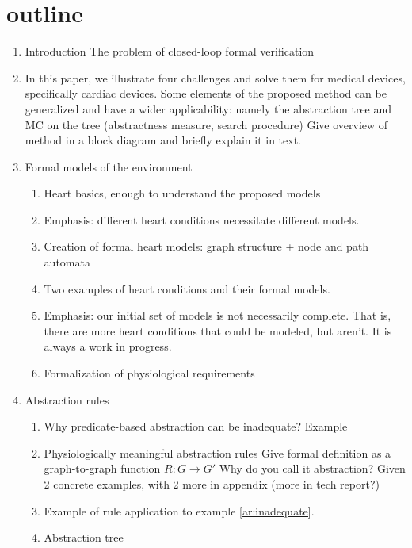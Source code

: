 \section{outline}

\begin{enumerate}
	\item Introduction
	\subitem The problem of closed-loop formal verification
	\item In this paper, we illustrate four challenges and solve them for medical devices, specifically cardiac devices.
	\subitem Some elements of the proposed method can be generalized and have a wider applicability: namely the abstraction tree and MC on the tree (abstractness measure, search procedure)
	\subitem Give overview of method in a block diagram and briefly explain it in text.
	
	\item Formal models of the environment
	\begin{enumerate}
		\item Heart basics, enough to understand the proposed models
		\item Emphasis: different heart conditions necessitate different models.
		\item Creation of formal heart models: graph structure + node and path automata
		\item Two examples of heart conditions and their formal models.
		\item Emphasis: our initial set of models is not necessarily complete. That is, there are more heart conditions that could be modeled, but aren't. It is always a work in progress.		
		\item Formalization of physiological requirements
	\end{enumerate}
	
	\item Abstraction rules
	\begin{enumerate}
		\item Why predicate-based abstraction can be inadequate? Example
		\label{ar:inadequate}
		\item Physiologically meaningful abstraction rules
		\subitem Give formal definition as a graph-to-graph function $R: G \rightarrow G'$ 
		\subitem Why do you call it abstraction? 
		\subitem Given 2 concrete examples, with 2 more in appendix (more in tech report?)
		\item Example of rule application to example \ref{ar:inadequate}.
		\item Abstraction tree		
	\end{enumerate}
	

\end{enumerate}
